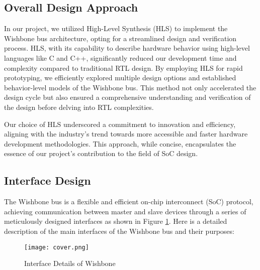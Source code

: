 \documentclass[conference]{IEEEtran}
\begin{document}
\subsection{Overall Design Approach}

In our project, we utilized High-Level Synthesis (HLS) to implement the Wishbone bus architecture, opting for a streamlined design and verification process. HLS, with its capability to describe hardware behavior using high-level languages like C and C++, significantly reduced our development time and complexity compared to traditional RTL design. By employing HLS for rapid prototyping, we efficiently explored multiple design options and established behavior-level models of the Wishbone bus. This method not only accelerated the design cycle but also ensured a comprehensive understanding and verification of the design before delving into RTL complexities.

Our choice of HLS underscored a commitment to innovation and efficiency, aligning with the industry's trend towards more accessible and faster hardware development methodologies. This approach, while concise, encapsulates the essence of our project's contribution to the field of SoC design.


\subsection{Interface Design}
The Wishbone bus is a flexible and efficient on-chip interconnect (SoC) protocol, achieving communication between master and slave devices through a series of meticulously designed interfaces as shown in Figure \ref{interface}. Here is a detailed description of the main interfaces of the Wishbone bus and their purposes:

\begin{figure}[h]
    \centering
    \texttt{[image: cover.png]}
    \caption{Interface Details of Wishbone}
    \label{interface}
\end{figure}
\end{document}

